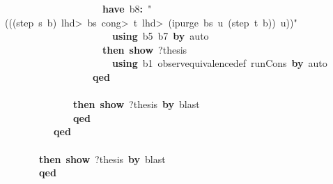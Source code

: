 \documentclass{article}
\newcommand{\syntaxKEYWORDA}[1]{\textcolor[rgb]{0.0,0.4,0.6}{\textbf{#1}}}
\newcommand{\syntaxKEYWORDC}[1]{\textcolor[rgb]{0.0,0.6,1.0}{\textbf{#1}}}
\newcommand{\syntaxLITERALA}[1]{\textcolor[rgb]{1.0,0.0,0.8}{#1}}
\newcommand{\syntaxOPERATOR}[1]{\textcolor[rgb]{0.0,0.0,0.0}{\textbf{#1}}}
\newcommand{\syntaxKEYWORDA}[1]{\textcolor[rgb]{0.0,0.4,0.6}{\textbf{#1}}}
\newcommand{\syntaxKEYWORDC}[1]{\textcolor[rgb]{0.0,0.6,1.0}{\textbf{#1}}}
\newcommand{\syntaxLITERALA}[1]{\textcolor[rgb]{1.0,0.0,0.8}{#1}}
\newcommand{\syntaxOPERATOR}[1]{\textcolor[rgb]{0.0,0.0,0.0}{\textbf{#1}}}
\newcommand{\syntaxKEYWORDA}[1]{\textcolor[rgb]{0.0,0.4,0.6}{\textbf{#1}}}
\newcommand{\syntaxKEYWORDC}[1]{\textcolor[rgb]{0.0,0.6,1.0}{\textbf{#1}}}
\newcommand{\syntaxLITERALA}[1]{\textcolor[rgb]{1.0,0.0,0.8}{#1}}
\newcommand{\syntaxOPERATOR}[1]{\textcolor[rgb]{0.0,0.0,0.0}{\textbf{#1}}}
\newcommand{\syntaxKEYWORDA}[1]{\textcolor[rgb]{0.0,0.4,0.6}{#1}}
\newcommand{\syntaxKEYWORDC}[1]{\textcolor[rgb]{0.0,0.6,1.0}{#1}}
\newcommand{\syntaxLITERALA}[1]{\textcolor[rgb]{1.0,0.0,0.8}{\textbf{#1}}}
\newcommand{\syntaxOPERATOR}[1]{\textcolor[rgb]{0.0,0.0,0.0}{#1}}
\newcommand{\syntaxKEYWORDA}[1]{\textcolor[rgb]{0.0,0.4,0.6}{\textbf{#1}}}
\newcommand{\syntaxKEYWORDC}[1]{\textcolor[rgb]{0.0,0.6,1.0}{\textbf{#1}}}
\newcommand{\syntaxLITERALA}[1]{\textcolor[rgb]{1.0,0.0,0.8}{#1}}
\newcommand{\syntaxOPERATOR}[1]{\textcolor[rgb]{0.0,0.0,0.0}{\textbf{#1}}}
\newcommand{\syntaxKEYWORDA}[1]{\textcolor[rgb]{0.0,0.4,0.6}{\textbf{#1}}}
\newcommand{\syntaxKEYWORDC}[1]{\textcolor[rgb]{0.0,0.6,1.0}{\textbf{#1}}}
\newcommand{\syntaxLITERALA}[1]{\textcolor[rgb]{1.0,0.0,0.8}{#1}}
\newcommand{\syntaxOPERATOR}[1]{\textcolor[rgb]{0.0,0.0,0.0}{\textbf{#1}}}
\begin{document}
{\ }{\ }{\ }{\ }{\ }{\ }{\ }{\ }{\ }{\ }{\ }{\ }{\ }{\ }{\ }{\ }{\ }{\ }{\ }{\ }\syntaxKEYWORDA{have}{\ }b8\syntaxOPERATOR{:}{\ }\syntaxLITERALA{"(((step{\ }s{\ }b){\ }\<lhd>{\ }bs{\ }\<cong>{\ }t{\ }\<lhd>{\ }(ipurge{\ }bs{\ }u{\ }(step{\ }t{\ }b)){\ }\usebox{\atbox}{\ }u))"}\hspace*{\fill}\\
{\ }{\ }{\ }{\ }{\ }{\ }{\ }{\ }{\ }{\ }{\ }{\ }{\ }{\ }{\ }{\ }{\ }{\ }{\ }{\ }{\ }{\ }\syntaxKEYWORDA{using}{\ }b5{\ }b7{\ }\syntaxKEYWORDA{by}{\ }auto\hspace*{\fill}\\
{\ }{\ }{\ }{\ }{\ }{\ }{\ }{\ }{\ }{\ }{\ }{\ }{\ }{\ }{\ }{\ }{\ }{\ }{\ }{\ }\syntaxKEYWORDA{then}{\ }\syntaxKEYWORDC{show}{\ }?thesis\hspace*{\fill}\\
{\ }{\ }{\ }{\ }{\ }{\ }{\ }{\ }{\ }{\ }{\ }{\ }{\ }{\ }{\ }{\ }{\ }{\ }{\ }{\ }{\ }{\ }\syntaxKEYWORDA{using}{\ }b1{\ }observ\usebox{\underscorebox}equivalence\usebox{\underscorebox}def{\ }run\usebox{\underscorebox}Cons{\ }\syntaxKEYWORDA{by}{\ }auto\hspace*{\fill}\\
{\ }{\ }{\ }{\ }{\ }{\ }{\ }{\ }{\ }{\ }{\ }{\ }{\ }{\ }{\ }{\ }{\ }{\ }\syntaxKEYWORDA{qed}\hspace*{\fill}\\
{\ }{\ }{\ }{\ }{\ }{\ }{\ }{\ }{\ }{\ }{\ }{\ }{\ }{\ }\syntaxKEYWORDA{\usebox{\closecurlybracket}}\hspace*{\fill}\\
{\ }{\ }{\ }{\ }{\ }{\ }{\ }{\ }{\ }{\ }{\ }{\ }{\ }{\ }\syntaxKEYWORDA{then}{\ }\syntaxKEYWORDC{show}{\ }?thesis{\ }\syntaxKEYWORDA{by}{\ }blast\hspace*{\fill}\\
{\ }{\ }{\ }{\ }{\ }{\ }{\ }{\ }{\ }{\ }{\ }{\ }{\ }{\ }\syntaxKEYWORDA{qed}\hspace*{\fill}\\
{\ }{\ }{\ }{\ }{\ }{\ }{\ }{\ }{\ }{\ }\syntaxKEYWORDA{qed}\hspace*{\fill}\\
{\ }{\ }{\ }{\ }{\ }{\ }{\ }\syntaxKEYWORDA{\usebox{\closecurlybracket}}\hspace*{\fill}\\
{\ }{\ }{\ }{\ }{\ }{\ }{\ }\syntaxKEYWORDA{then}{\ }\syntaxKEYWORDC{show}{\ }?thesis{\ }\syntaxKEYWORDA{by}{\ }blast\hspace*{\fill}\\
{\ }{\ }{\ }{\ }{\ }{\ }{\ }\syntaxKEYWORDA{qed}{\ }\hspace*{\fill}\\
\end{document}
